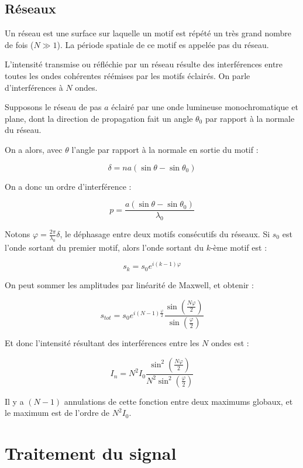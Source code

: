 \documentclass[a4paper,12pt]{book}
\newcommand{\Def}[2]{\begin{tcolorbox}[colback=white,colframe=red!10!green!20!blue!75!, title=Définition : #1]#2\end{tcolorbox}}
\newcommand{\Thr}[2]{\begin{tcolorbox}[sharp corners, colback=white,colframe=red!10!blue!30!green!75!, title=Théorème : #1]#2\end{tcolorbox}}
\begin{document}
\subsection{Réseaux}
\Def{Dispositif}{Un réseau est une surface sur laquelle un motif est répété un très grand nombre de fois ($N\gg 1$). La période spatiale de ce motif es appelée pas du réseau.
\par L'intensité transmise ou réfléchie par un réseau résulte des interférences entre toutes les ondes cohérentes réémises par les motifs éclairés. On parle d'interférences à $N$ ondes.}
\Thr{Formule des réseaux}{Supposons le réseau de pas $a$ éclairé par une onde lumineuse monochromatique et plane, dont la direction de propagation fait un angle $\theta_0$ par rapport à la normale du réseau.
\par On a alors, avec $\theta$ l'angle par rapport à la normale en sortie du motif :
\par $$\delta = na(\sin\theta -\sin\theta_0)$$
\par On a donc un ordre d'interférence :
\par $$p = \frac{a(\sin\theta -\sin\theta_0)}{\lambda_0}$$}
\Thr{Intensité résultante}{Notons $\varphi = \frac{2\pi}{\lambda_0}\delta$, le déphasage entre deux motifs consécutifs du réseaux. Si $s_0$ est l'onde sortant du premier motif, alors l'onde sortant du $k$-ème motif est :
\par $$s_k = s_0e^{i(k-1)\varphi}$$
\par On peut sommer les amplitudes par linéarité de Maxwell, et obtenir :
\par $$s_{tot} = s_0e^{i(N-1)\frac{\varphi}{2}}\frac{\sin\left(\frac{N\varphi}{2}\right)}{\sin\left(\frac{\varphi}{2}\right)}$$
\par Et donc l'intensité résultant des interférences entre les $N$ ondes est :
\par $$I_n = N^2I_0\dfrac{\sin^2\left(\frac{N\varphi}{2}\right)}{N^2\sin^2\left(\frac{\varphi}{2}\right)}$$
\par Il y a $(N-1)$ annulations de cette fonction entre deux maximums globaux, et le maximum est de l'ordre de $N^2I_0$.}


\newpage
\section{Traitement du signal}
\end{document}
